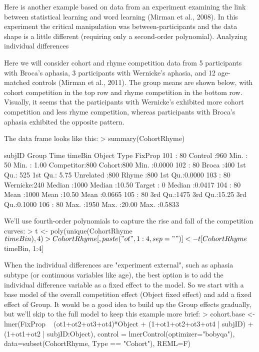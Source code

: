 Here is another example based on data from an experiment examining the link between statistical learning and word learning (Mirman et al., 2008). In this experiment the critical manipulation was between-participants and the data shape is a little different (requiring only a second-order polynomial). 
Analyzing individual differences

Here we will consider cohort and rhyme competition data from 5 participants with Broca's aphasia, 3 participants with Wernicke's aphasia, and 12 age-matched controls (Mirman et al., 2011). The group means are shown below, with cohort competition in the top row and rhyme competition in the bottom row. Visually, it seems that the participants with Wernicke's exhibited more cohort competition and less rhyme competition, whereas participants with Broca's aphasia exhibited the opposite pattern.
 
The data frame looks like this:
> summary(CohortRhyme)

     subjID          Group          Time         timeBin             Object        Type        FixProp      
 101    :  80   Control :960   Min.   :  50   Min.   : 1.00   Competitor:800   Cohort:800   Min.   :0.0000  
 102    :  80   Broca   :400   1st Qu.: 525   1st Qu.: 5.75   Unrelated :800   Rhyme :800   1st Qu.:0.0000  
 103    :  80   Wernicke:240   Median :1000   Median :10.50   Target    :  0                Median :0.0417  
 104    :  80                  Mean   :1000   Mean   :10.50                                 Mean   :0.0665  
 105    :  80                  3rd Qu.:1475   3rd Qu.:15.25                                 3rd Qu.:0.1000  
 106    :  80                  Max.   :1950   Max.   :20.00                                 Max.   :0.5833


We'll use fourth-order polynomials to capture the rise and fall of the competition curves:
> t <- poly(unique(CohortRhyme$timeBin), 4)
> CohortRhyme[,paste("ot", 1:4, sep="")] <- t[CohortRhyme$timeBin, 1:4]

When the individual differences are "experiment external", such as aphasia subtype (or continuous variables like age), the best option is to add the individual difference variable as a fixed effect to the model. So we start with a base model of the overall competition effect (Object fixed effect) and add a fixed effect of Group. It would be a good idea to build up the Group effects gradually, but we'll skip to the full model to keep this example more brief:
> cohort.base <- lmer(FixProp ~ (ot1+ot2+ot3+ot4)*Object + (1+ot1+ot2+ot3+ot4 | subjID) + (1+ot1+ot2 | subjID:Object), control = lmerControl(optimizer="bobyqa"), data=subset(CohortRhyme, Type == "Cohort"), REML=F)

